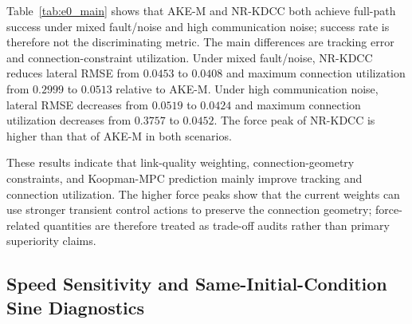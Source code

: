 \documentclass[twocolumn,3p,times,procedia]{elsarticle}
\newcommand{\AKE}{AKE-M}
\newcommand{\Method}{NR-KDCC}
\begin{document}
Table~\ref{tab:e0_main} shows that \AKE{} and \Method{} both achieve full-path success under mixed fault/noise and high communication noise; success rate is therefore not the discriminating metric. The main differences are tracking error and connection-constraint utilization. Under mixed fault/noise, \Method{} reduces lateral RMSE from $0.0453$ to $0.0408$ and maximum connection utilization from $0.2999$ to $0.0513$ relative to \AKE{}. Under high communication noise, lateral RMSE decreases from $0.0519$ to $0.0424$ and maximum connection utilization decreases from $0.3757$ to $0.0452$. The force peak of \Method{} is higher than that of \AKE{} in both scenarios.

These results indicate that link-quality weighting, connection-geometry constraints, and Koopman-MPC prediction mainly improve tracking and connection utilization. The higher force peaks show that the current weights can use stronger transient control actions to preserve the connection geometry; force-related quantities are therefore treated as trade-off audits rather than primary superiority claims.

\subsection{Speed Sensitivity and Same-Initial-Condition Sine Diagnostics}
\end{document}
